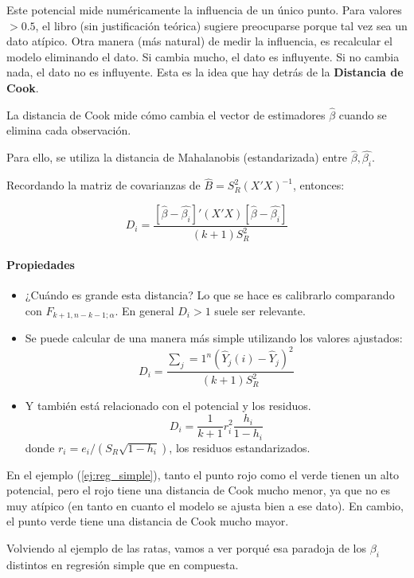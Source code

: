 Este potencial mide numéricamente la influencia de un único punto. Para valores $>0.5$, el libro (sin justificación teórica) sugiere preocuparse porque tal vez sea un dato atípico. Otra manera (más natural) de medir la influencia, es recalcular el modelo eliminando el dato. Si cambia mucho, el dato es influyente. Si no cambia nada, el dato no es influyente. Esta es la idea que hay detrás de la \textbf{Distancia de Cook}.

\begin{defn}
La distancia de Cook mide cómo cambia el vector de estimadores $\hat{β}$ cuando se elimina cada observación.

Para ello, se utiliza la distancia de Mahalanobis (estandarizada) entre $\hat{β},\hat{β_i}$.

Recordando la matriz de covarianzas de $\hat{B} = S_R^2(X'X)^{-1}$, entonces:

\[D_i = \frac{[\hat{β} - \hat{β_i}]' (X'X) [\hat{β} - \hat{β_i}]}{(k+1)S_R^2} \]
\end{defn}

\paragraph{Propiedades}
\begin{itemize}
	\item ¿Cuándo es grande esta distancia? Lo que se hace es calibrarlo comparando con $F_{k+1,n-k-1;α}$. En general $D_i>1$ suele ser relevante.
	\item Se puede calcular de una manera más simple utilizando los valores ajustados:
	\[D_i = \frac{\sum_j=1^n \left(\hat{Y}_j(i) - \hat{Y}_j\right)^2}{(k+1)S_R^2}\]
	\item Y también está relacionado con el potencial y los residuos.
	\[
		D_i = \frac{1}{k+1}r_i^2 \frac{h_i}{1-h_i}
	\]
	donde $r_i = e_i/(S_R\sqrt{1-h_i})$, los residuos estandarizados.
\end{itemize}



En el ejemplo (\ref{ej:reg_simple}), tanto el punto rojo como el verde tienen un alto potencial, pero el rojo tiene una distancia de Cook mucho menor, ya que no es muy atípico  (en tanto en cuanto el modelo se ajusta bien a ese dato). En cambio, el punto verde tiene una distancia de Cook mucho mayor.

Volviendo al ejemplo de las ratas, vamos a ver porqué esa paradoja de los $β_i$ distintos en regresión simple que en compuesta.



